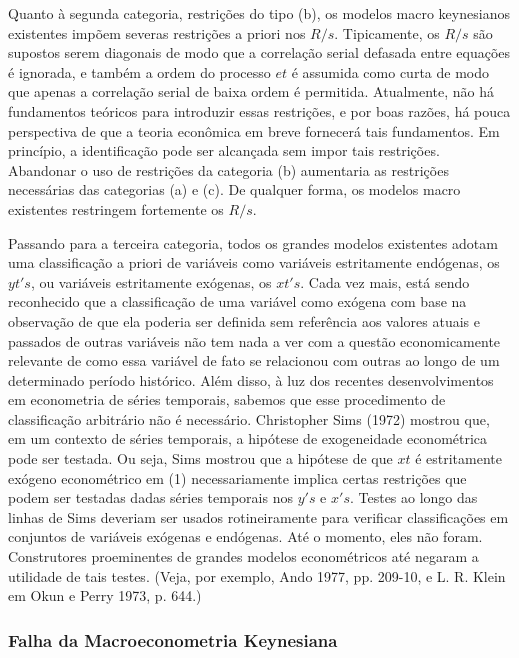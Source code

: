\documentclass[12pt]{article}
\begin{document}
Quanto à segunda categoria, restrições do tipo (b), os modelos macro keynesianos existentes impõem severas restrições a priori nos $R/s$. Tipicamente, os $R/s$ são supostos serem diagonais de modo que a correlação serial defasada entre equações é ignorada, e também a ordem do processo $et$ é assumida como curta de modo que apenas a correlação serial de baixa ordem é permitida. Atualmente, não há fundamentos teóricos para introduzir essas restrições, e por boas razões, há pouca perspectiva de que a teoria econômica em breve fornecerá tais fundamentos. Em princípio, a identificação pode ser alcançada sem impor tais restrições. Abandonar o uso de restrições da categoria (b) aumentaria as restrições necessárias das categorias (a) e (c). De qualquer forma, os modelos macro existentes restringem fortemente os $R/s$.

Passando para a terceira categoria, todos os grandes modelos existentes adotam uma classificação a priori de variáveis como variáveis estritamente endógenas, os $yt's$, ou variáveis estritamente exógenas, os $xt's$. Cada vez mais, está sendo reconhecido que a classificação de uma variável como exógena com base na observação de que ela poderia ser definida sem referência aos valores atuais e passados de outras variáveis não tem nada a ver com a questão economicamente relevante de como essa variável de fato se relacionou com outras ao longo de um determinado período histórico. Além disso, à luz dos recentes desenvolvimentos em econometria de séries temporais, sabemos que esse procedimento de classificação arbitrário não é necessário. Christopher Sims (1972) mostrou que, em um contexto de séries temporais, a hipótese de exogeneidade econométrica pode ser testada. Ou seja, Sims mostrou que a hipótese de que $xt$ é estritamente exógeno econométrico em (1) necessariamente implica certas restrições que podem ser testadas dadas séries temporais nos $y's$ e $x's$. Testes ao longo das linhas de Sims deveriam ser usados rotineiramente para verificar classificações em conjuntos de variáveis exógenas e endógenas. Até o momento, eles não foram. Construtores proeminentes de grandes modelos econométricos até negaram a utilidade de tais testes. (Veja, por exemplo, Ando 1977, pp. 209-10, e L. R. Klein em Okun e Perry 1973, p. 644.)

\subsubsection{\textbf{Falha da Macroeconometria Keynesiana}}
\end{document}
